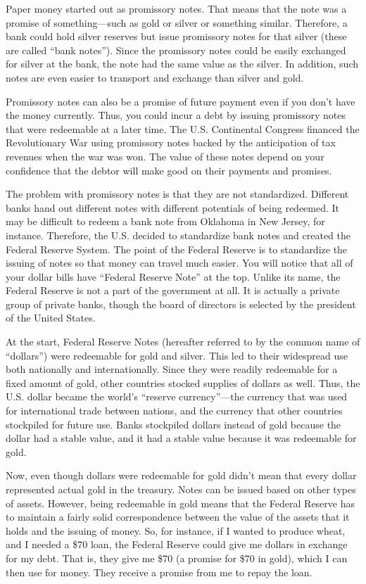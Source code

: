 Paper money started out as promissory notes. That means that the note
was a promise of something—such as gold or silver or something similar.
Therefore, a bank could hold silver reserves but issue promissory notes
for that silver (these are called “bank notes”). Since the promissory
notes could be easily exchanged for silver at the bank, the note had
the same value as the silver.  In addition, such notes are even easier
to transport and exchange than silver and gold.

Promissory notes can also be a promise of future payment even if you
don’t have the money
currently. Thus, you
could incur a debt by issuing promissory notes that were redeemable at
a later time. The U.S. Continental Congress financed the Revolutionary
War using promissory notes backed by the anticipation of tax revenues
when the war was won.  The value of these notes depend on your confidence
that the debtor will make good on their payments and promises.

The problem with promissory notes is that they are not standardized.
Different banks hand out different notes with different potentials of
being redeemed. It may be difficult to redeem a bank note from Oklahoma
in New Jersey, for instance. Therefore, the U.S. decided to standardize
bank notes and created the Federal Reserve System. The point of the
Federal Reserve is to standardize the issuing of notes so that money
can travel much easier. You will notice that all of your dollar bills
have “Federal Reserve Note” at the top.  Unlike its name, the Federal
Reserve is not a part of the government at all.  It is actually a
private group of private banks, though the board of directors is
selected by the president of the United States.

At the start, Federal Reserve Notes (hereafter referred to by the common
name of “dollars”) were redeemable for gold and silver. This led to
their widespread use both nationally and internationally. Since they
were readily redeemable for a fixed amount of gold, other countries
stocked supplies of dollars as well. Thus, the U.S. dollar became the
world’s “reserve currency”—the currency that was used for international
trade between nations, and the currency that other countries stockpiled
for future use. Banks stockpiled dollars instead of gold because the dollar had a stable value, and it
had a stable value because it was redeemable for gold.

Now, even though dollars were redeemable for gold didn’t mean that every
dollar represented actual gold in the treasury. Notes can be issued
based on other types of assets. However, being redeemable in gold means
that the Federal Reserve has to maintain a fairly solid correspondence
between the value of the assets that it holds and the issuing of money.
So, for instance, if I wanted to produce wheat, and I needed a \$70
loan, the Federal Reserve could give me dollars in exchange for my
debt. That is, they give me \$70 (a promise for \$70 in gold), which I
can then use for money. They receive a promise from me to repay the
loan. 

